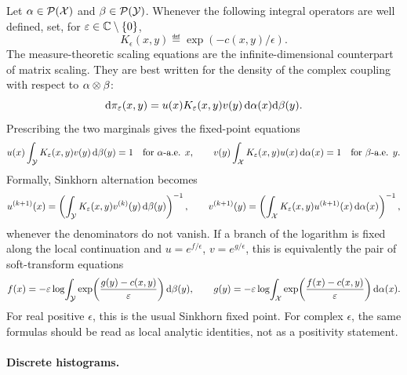 Let $\alpha\in\mathcal{P}(\mathcal{X})$ and $\beta\in\mathcal{P}(\mathcal{Y})$. Whenever the following integral operators are well defined, set, for $\varepsilon\in\mathbb{C}\setminus\{0\}$,
\[
	K_\epsilon(x,y)\eqdef \exp(-c(x,y)/\epsilon).
\]
The measure-theoretic scaling equations are the infinite-dimensional counterpart of matrix scaling. They are best written for the density of the complex coupling with respect to $\alpha\otimes\beta$:
\begin{equation}\label{eq-complex-measure-coupling}
	\mathrm{d}\pi_\varepsilon(x,y)
	=
	u(x)K_\varepsilon(x,y)v(y)\,\mathrm{d}\alpha(x)\mathrm{d}\beta(y).
\end{equation}
Prescribing the two marginals gives the fixed-point equations
\begin{equation}\label{eq-complex-measure-fixed-point}
	u(x)\int_{\mathcal{Y}} K_\varepsilon(x,y)v(y)\,\mathrm{d}\beta(y)=1
	\quad \text{for }\alpha\text{-a.e. }x,
	\qquad
	v(y)\int_{\mathcal{X}} K_\varepsilon(x,y)u(x)\,\mathrm{d}\alpha(x)=1
	\quad \text{for }\beta\text{-a.e. }y .
\end{equation}
Formally, Sinkhorn alternation becomes
\begin{equation}\label{eq-complex-measure-iteration}
	u^{(k+1)}(x)=
	\left(\int_{\mathcal{Y}} K_\varepsilon(x,y)v^{(k)}(y)\,\mathrm{d}\beta(y)\right)^{-1},
	\qquad
	v^{(k+1)}(y)=
	\left(\int_{\mathcal{X}} K_\varepsilon(x,y)u^{(k+1)}(x)\,\mathrm{d}\alpha(x)\right)^{-1},
\end{equation}
whenever the denominators do not vanish. If a branch of the logarithm is fixed along the local continuation and $u=e^{f/\epsilon}$, $v=e^{g/\epsilon}$, this is equivalently the pair of soft-transform equations
\[
	f(x)=-\varepsilon\log\!\int_{\mathcal{Y}} \exp\!\left(\frac{g(y)-c(x,y)}{\varepsilon}\right)\mathrm{d}\beta(y),
	\qquad
	g(y)=-\varepsilon\log\!\int_{\mathcal{X}} \exp\!\left(\frac{f(x)-c(x,y)}{\varepsilon}\right)\mathrm{d}\alpha(x).
\]
For real positive $\epsilon$, this is the usual Sinkhorn fixed point. For complex $\epsilon$, the same formulas should be read as local analytic identities, not as a positivity statement.

\paragraph{Discrete histograms.}

